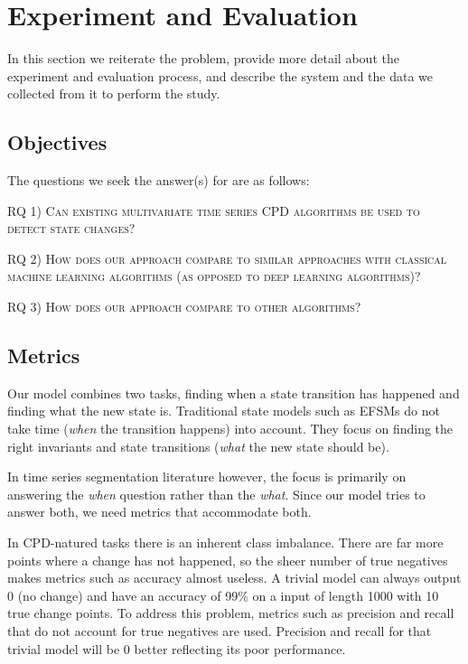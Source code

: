 \section{Experiment and Evaluation}
In this section we reiterate the problem, provide more detail about the experiment and evaluation process, and describe the system and the data we collected from it to perform the study.


\subsection{Objectives}
The questions we seek the answer(s) for are as follows:


\textsc{RQ 1) Can existing multivariate time series CPD algorithms be used to detect state changes?}


\textsc{RQ 2) How does our approach compare to similar approaches with classical machine learning algorithms (as opposed to deep learning algorithms)?}


\textsc{RQ 3) How does our approach compare to other algorithms?}


\subsection{Metrics}

Our model combines two tasks, finding when a state transition has happened and finding what the new state is. Traditional state models such as EFSMs do not take time (\textit{when} the transition happens) into account. They focus on finding the right invariants and state transitions (\textit{what} the new state should be).

In time series segmentation literature however, the focus is primarily on answering the \textit{when} question rather than the \textit{what}. Since our model tries to answer both, we need metrics that accommodate both.

In CPD-natured tasks there is an inherent class imbalance.
There are far more points where a change has not happened, so the sheer number of true negatives makes metrics such as accuracy almost useless. 
A trivial model can always output 0 (no change) and have an accuracy of 99\% on a input of length 1000 with 10 true change points.
To address this problem, metrics such as precision and recall that do not account for true negatives are used. \cite{Truong2018ChangePointSurvey, Lee2018TimeSeriesSegmentation} 
Precision and recall for that trivial model will be 0 better reflecting its poor performance.


